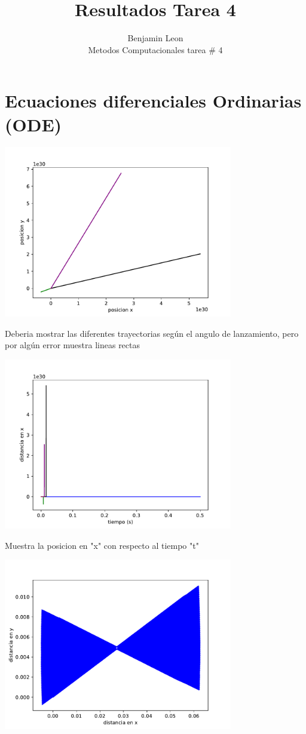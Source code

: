 \documentclass[12pt]{article}
\begin{document}
 

 
\title{Resultados Tarea 4}
\author{Benjamin Leon\\
Metodos Computacionales tarea \# 4} 
\maketitle


\section{Ecuaciones diferenciales Ordinarias (ODE)}
\begin{centering}
\includegraphics[width=0.75\textwidth]{grafsODE.pdf}

Deberia mostrar las diferentes trayectorias seg\'un el angulo de lanzamiento, pero por alg\'un error muestra lineas rectas

\includegraphics[width=0.75\textwidth]{grafsODE2.pdf}

Muestra la posicion en "x" con respecto al tiempo "t"

\includegraphics[width=0.75\textwidth]{grados.pdf}


\end{centering}
\end{document}
